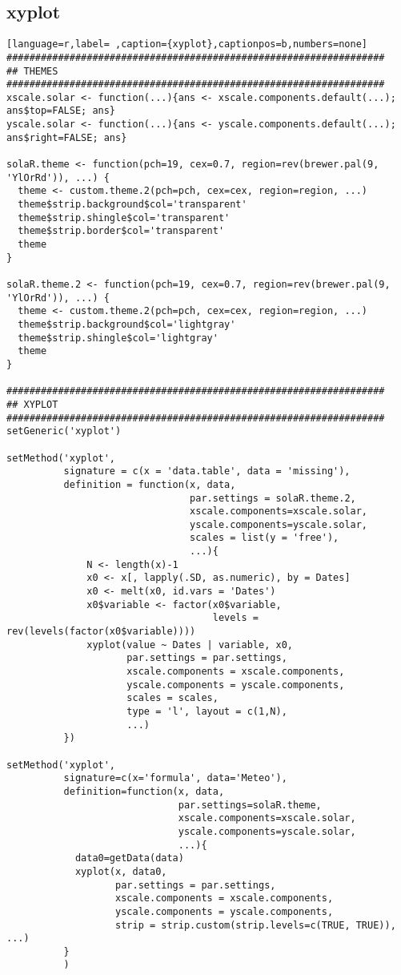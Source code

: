 \subsection{xyplot}
\label{sec:org2ff9646}
\label{subsec:xyplot}
\begin{lstlisting}[language=r,label= ,caption={xyplot},captionpos=b,numbers=none]
##################################################################
## THEMES
##################################################################
xscale.solar <- function(...){ans <- xscale.components.default(...); ans$top=FALSE; ans}
yscale.solar <- function(...){ans <- yscale.components.default(...); ans$right=FALSE; ans}

solaR.theme <- function(pch=19, cex=0.7, region=rev(brewer.pal(9, 'YlOrRd')), ...) {
  theme <- custom.theme.2(pch=pch, cex=cex, region=region, ...)
  theme$strip.background$col='transparent'
  theme$strip.shingle$col='transparent'
  theme$strip.border$col='transparent'
  theme
}

solaR.theme.2 <- function(pch=19, cex=0.7, region=rev(brewer.pal(9, 'YlOrRd')), ...) {
  theme <- custom.theme.2(pch=pch, cex=cex, region=region, ...)
  theme$strip.background$col='lightgray'
  theme$strip.shingle$col='lightgray'
  theme
}

##################################################################
## XYPLOT
##################################################################
setGeneric('xyplot')

setMethod('xyplot',
          signature = c(x = 'data.table', data = 'missing'),
          definition = function(x, data,
                                par.settings = solaR.theme.2,
                                xscale.components=xscale.solar,
                                yscale.components=yscale.solar,
                                scales = list(y = 'free'),
                                ...){
              N <- length(x)-1
              x0 <- x[, lapply(.SD, as.numeric), by = Dates]
              x0 <- melt(x0, id.vars = 'Dates')
              x0$variable <- factor(x0$variable,
                                    levels = rev(levels(factor(x0$variable))))
              xyplot(value ~ Dates | variable, x0,
                     par.settings = par.settings,
                     xscale.components = xscale.components,
                     yscale.components = yscale.components,
                     scales = scales,
                     type = 'l', layout = c(1,N),
                     ...)
          })

setMethod('xyplot',
          signature=c(x='formula', data='Meteo'),
          definition=function(x, data,
                              par.settings=solaR.theme,
                              xscale.components=xscale.solar,
                              yscale.components=yscale.solar,
                              ...){
            data0=getData(data)
            xyplot(x, data0,
                   par.settings = par.settings,
                   xscale.components = xscale.components,
                   yscale.components = yscale.components,
                   strip = strip.custom(strip.levels=c(TRUE, TRUE)), ...)
          }
          )


\end{lstlisting}
